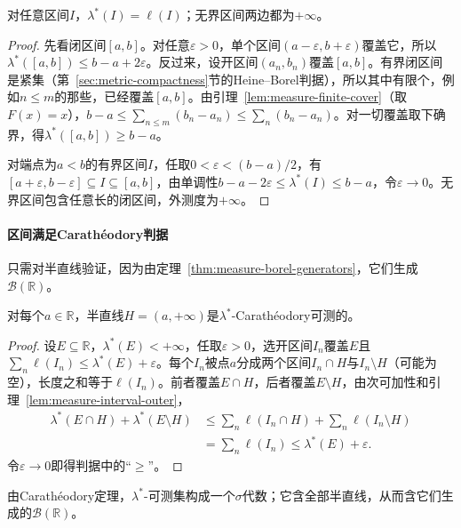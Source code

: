 \begin{lemma}[区间的Lebesgue外测度]
\label{lem:measure-interval-outer}
对任意区间$I$，$\lambda^*(I)=\ell(I)$；无界区间两边都为$+\infty$。
\end{lemma}

\begin{proof}
先看闭区间$[a,b]$。对任意$\varepsilon>0$，单个区间$(a-\varepsilon,b+\varepsilon)$覆盖它，所以$\lambda^*([a,b])\le b-a+2\varepsilon$。反过来，设开区间$(a_n,b_n)$覆盖$[a,b]$。有界闭区间是紧集（第~\ref{sec:metric-compactness}节的Heine--Borel判据），所以其中有限个，例如$n\le m$的那些，已经覆盖$[a,b]$。由引理~\ref{lem:measure-finite-cover}（取$F(x)=x$），$b-a\le\sum_{n\le m}(b_n-a_n)\le\sum_n(b_n-a_n)$。对一切覆盖取下确界，得$\lambda^*([a,b])\ge b-a$。

对端点为$a<b$的有界区间$I$，任取$0<\varepsilon<(b-a)/2$，有$[a+\varepsilon,b-\varepsilon]\subseteq I\subseteq[a,b]$，由单调性$b-a-2\varepsilon\le\lambda^*(I)\le b-a$，令$\varepsilon\to0$。无界区间包含任意长的闭区间，外测度为$+\infty$。
\end{proof}

\paragraph{区间满足Carathéodory判据}
只需对半直线验证，因为由定理~\ref{thm:measure-borel-generators}，它们生成$\mathcal B(\mathbb R)$。

\begin{lemma}[半直线的可测性]
\label{lem:measure-halfline-measurable}
对每个$a\in\mathbb R$，半直线$H=(a,+\infty)$是$\lambda^*$-Carathéodory可测的。
\end{lemma}

\begin{proof}
设$E\subseteq\mathbb R$，$\lambda^*(E)<+\infty$，任取$\varepsilon>0$，选开区间$I_n$覆盖$E$且$\sum_n\ell(I_n)\le\lambda^*(E)+\varepsilon$。每个$I_n$被点$a$分成两个区间$I_n\cap H$与$I_n\setminus H$（可能为空），长度之和等于$\ell(I_n)$。前者覆盖$E\cap H$，后者覆盖$E\setminus H$，由次可加性和引理~\ref{lem:measure-interval-outer}，
\[
 \begin{aligned}
  \lambda^*(E\cap H)+\lambda^*(E\setminus H)
  &\le\sum_n\ell(I_n\cap H)+\sum_n\ell(I_n\setminus H)\\
  &=\sum_n\ell(I_n)\le\lambda^*(E)+\varepsilon.
 \end{aligned}
\]
令$\varepsilon\to0$即得判据中的“$\ge$”。
\end{proof}

由Carathéodory定理，$\lambda^*$-可测集构成一个$\sigma$代数；它含全部半直线，从而含它们生成的$\mathcal B(\mathbb R)$。

